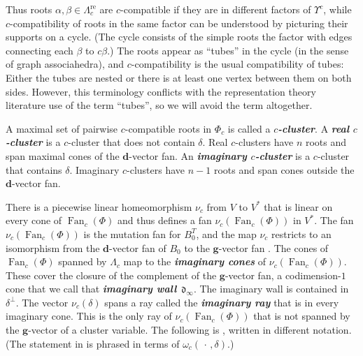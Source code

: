 \documentclass{amsart}
\theoremstyle{definition}
\theoremstyle{remark}
\numberwithin{equation}{section}
\newcommand{\newword}[1]{\textbf{\emph{#1}}}
\newcommand{\0}{{\mathbf{0}}}
\newcommand{\g}{\mathbf{g}}
\newcommand{\Fan}{\operatorname{Fan}}
\newcommand{\re}{\mathrm{re}}
\renewcommand{\d}{{\mathfrak d}}
\newcommand{\dd}{{\mathbf d}}
\newcommand{\fin}{\mathrm{fin}}
\newcommand{\RSChar}{\Phi}
\newcommand{\RS}{\RSChar}
\newcommand{\RSpos}{\RS^+}
\newcommand{\RSfin}{\RS_\fin}
\newcommand{\SimplesChar}{\Pi}
\newcommand{\Simples}{\SimplesChar}
\newcommand{\RSTChar}{\Upsilon}
\newcommand{\RST}[1]{\RSTChar^{#1}}
\newcommand{\AP}[1]{\RS_{#1}}
\newcommand{\APTChar}{\Lambda}
\newcommand{\APT}[1]{\APTChar_{#1}}
\newcommand{\APTre}[1]{\APT{#1}^\re}
\begin{document}
Thus roots $\alpha,\beta\in\APTre{c}$ are $c$-compatible if they are in different factors of $\RST{c}$, while
$c$-compatibility of roots in the same factor can be understood by picturing their supports on a cycle.
(The cycle consists of the simple roots the factor with edges connecting each $\beta$ to $c\beta$.)
The roots appear as ``tubes'' in the cycle (in the sense of graph associahedra), and $c$-compatibility is the usual compatibility of tubes:
Either the tubes are nested or there is at least one vertex between them on both sides.
However, this terminology conflicts with the representation theory literature use of the term ``tubes'', so we will avoid the term altogether.


A maximal set of pairwise $c$-compatible roots in $\AP{c}$ is called a \newword{$c$-cluster}.
A \newword{real $c$-cluster} is a $c$-cluster that does not contain $\delta$.
Real $c$-clusters have $n$ roots and span maximal cones of the $\dd$-vector fan.
An \newword{imaginary $c$-cluster} is a $c$-cluster that contains $\delta$.
Imaginary $c$-clusters have $n-1$ roots and span cones outside the $\dd$-vector fan.

There is a piecewise linear homeomorphism $\nu_c$ from $V$ to $V^*$ that is linear on every cone of $\Fan_c(\RS)$ and thus defines a fan $\nu_c(\Fan_c(\RS))$ in $V^*$.
The fan $\nu_c(\Fan_c(\RS))$ is the mutation fan for $B_0^T$, and the map $\nu_c$ restricts to an isomorphism from the $\dd$-vector fan of $B_0$ to the $\g$-vector fan \cite[Theorem~2.9]{affscat}.
The cones of $\Fan_c(\RS)$ spanned by $\APT{c}$ map to the \newword{imaginary cones} of $\nu_c(\Fan_c(\RS))$.
These cover the closure of the complement of the $\g$-vector fan, a codimension-$1$ cone that we call that \newword{imaginary wall}~$\d_\infty$.
The imaginary wall is contained in $\delta^\perp$.
The vector $\nu_c(\delta)$ spans a ray called the \newword{imaginary ray} that is in every imaginary cone.
This is the only ray of $\nu_c(\Fan_c(\RS))$ that is not spanned by the $\g$-vector of a cluster variable.
The following  is \cite[Lemma~5.9]{affscat}, written in different notation.
(The statement in \cite{affscat} is phrased in terms of $\omega_c(\,\cdot\,,\delta)$.)
\end{document}
